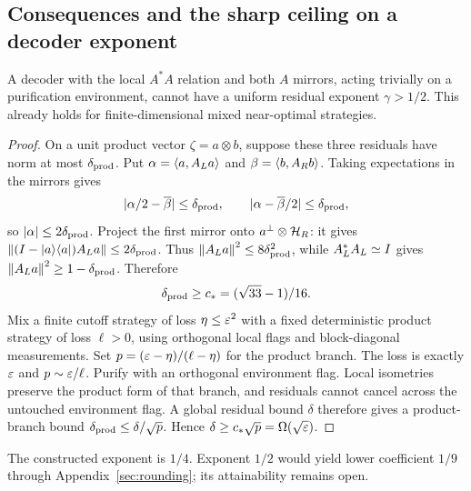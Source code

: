 \subsection{Consequences and the sharp ceiling on a decoder exponent}\label{dec:sec:consequences}
\begin{proposition}\label{dec:prop:ceiling}
A decoder with the local $A^*A$ relation and both $A$ mirrors, acting trivially on a purification environment, cannot have a uniform residual exponent $\gamma>1/2$. This already holds for finite-dimensional mixed near-optimal strategies.
\end{proposition}
\begin{proof}
On a unit product vector $\zeta=a\otimes b$, suppose these three residuals have norm at most $\delta_{\rm prod}$. Put $\alpha=\left\langle a,A_La\right\rangle$ and $\beta=\left\langle b,A_Rb\right\rangle$. Taking expectations in the mirrors gives
\[
|\alpha/2-\overline\beta|\le \delta_{\rm prod},\qquad
|\alpha-\overline\beta/2|\le \delta_{\rm prod},
\]
so $|\alpha|\le2\delta_{\rm prod}$. Project the first mirror onto $a^\perp\otimes\mathcal H_R$: it gives
$\left\lVert(I-|a\rangle\langle a|)A_La\right\rVert\le2\delta_{\rm prod}$.
Thus $\left\lVert A_La\right\rVert^2\le8\delta_{\rm prod}^2$, while $A_L^*A_L\simeq I$ gives
$\left\lVert A_La\right\rVert^2\ge1-\delta_{\rm prod}$. Therefore
\[
\delta_{\rm prod}\ge c_*=(\sqrt{33}-1)/16.
\]
Mix a finite cutoff strategy of loss $\eta\le\varepsilon^2$ with a fixed deterministic product strategy of loss $\ell>0$, using orthogonal local flags and block-diagonal measurements. Set
$p=(\varepsilon-\eta)/(\ell-\eta)$ for the product branch. The loss is exactly $\varepsilon$ and $p\sim\varepsilon/\ell$. Purify with an orthogonal environment flag. Local isometries preserve the product form of that branch, and residuals cannot cancel across the untouched environment flag. A global residual bound $\delta$ therefore gives a product-branch bound $\delta_{\rm prod}\le\delta/\sqrt p$. Hence
$\delta\ge c_*\sqrt p=\Omega(\sqrt{\varepsilon})$.
\end{proof}

The constructed exponent is $1/4$. Exponent $1/2$ would yield lower coefficient $1/9$ through Appendix~\ref{sec:rounding}; its attainability remains open.

